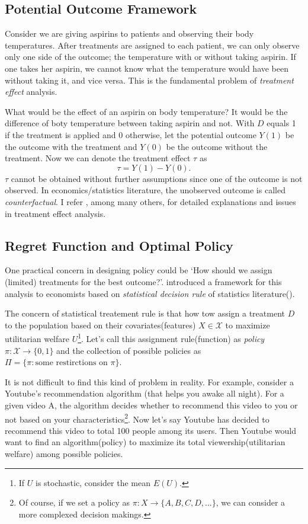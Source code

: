 \documentclass[11pt]{article}
\begin{document}
	\subsection*{Potential Outcome Framework}
	Consider we are giving aspirins to patients and observing their body temperatures. After treatments are assigned to each patient, we can only observe only one side of the outcome; the temperature with or without taking aspirin. If one takes her aspirin, we cannot know what the temperature would have been without taking it, and vice versa. This is the fundamental problem of \textit{treatment effect} analysis.
	
	What would be the effect of an aspirin on body temperature? It would be the difference of boty temperature between taking aspirin and not. With $D$ equals 1 if the treatment is applied and 0 otherwise, let the potential outcome $Y(1)$ be the outcome with the treatment and $Y(0)$ be the outcome without the treatment. Now we can denote the treatment effect $\tau$ as
	$$
	\tau = Y(1) - Y(0).
	$$
	$\tau$ cannot be obtained without further assumptions since one of the outcome is not observed. In economics/statistics literature, the unobserved outcome is called \textit{counterfactual}. I refer \cite{imbens2015causal}, among many others,  for detailed explanations and issues in treatment effect analysis.
	
	\subsection*{Regret Function and Optimal Policy}
	One practical concern in designing policy could be `How should we assign (limited) treatments for the best outcome?'.
	 \cite{Manski.2004} introduced a framework for this analysis to economists based on \textit{statistical decision rule} of statistics literature(\cite{wald1950statistical}). 
	 
	 The concern of statistical treatement rule is that how tow assign a treatment $D$ to the population based on their covariates(features) $X \in \mathcal{X}$ to maximize utilitarian welfare $U$\footnote{If $U$ is stochastic, consider the mean $E(U)$.}. Let's call this assignment rule(function) as \textit{policy} $\pi:\mathcal{X} \rightarrow \{0,1\}$ and the collection of possible policies as $\Pi=\{\pi: \text{some restirctions on } \pi\}$.
	 
	 It is not difficult to find this kind of problem in reality. For example, consider a Youtube's recommendation algorithm (that helps you awake all night). For a given video A, the algorithm decides whether to recommend this video to you or not based on your characteristics\footnote{Of course, if we set a policy as $\pi:X \rightarrow \{A,B,C,D,...\}$, we can consider a more complexed decision makings.}. Now let's say Youtube has decided to  recommend this video to total 100 people among its users. Then Youtube would want to find an algorithm(policy) to maximize its total viewership(utilitarian welfare) among possible policies.
	 
\end{document}
